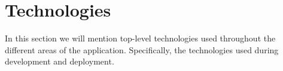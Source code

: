 \section{Technologies}\label{sec:technologies}

In this section we will mention top-level technologies used throughout the different areas of the application.
Specifically, the technologies used during development and deployment.



